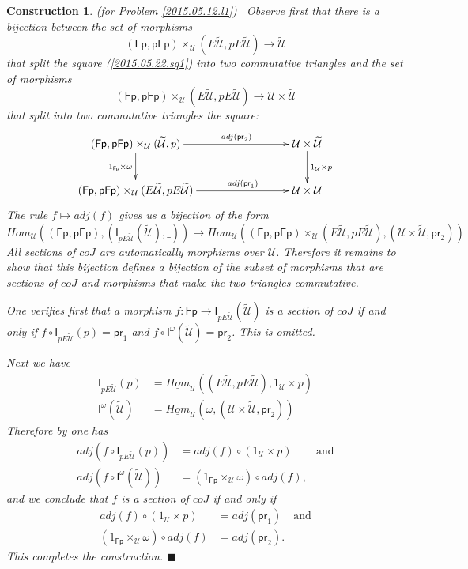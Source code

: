 \documentclass[12pt]{article}
\numberwithin{equation}{section}
\newtheorem{construction0}[proposition]{Construction}
\newenvironment{construction}[1]{\begin{construction0}(for Problem \ref{#1})\ }{$\blacksquare$ \end{construction0}}
\newcommand{\sr}{\rightarrow}
\newcommand{\uu}{\underline}
\newcommand{\iHom}{\uu{Hom}}
\newcommand{\wt}{\widetilde}
\newcommand{\id}{1}            %
\newcommand{\U}{\mathcal{U}}
\newcommand{\I}{\mathsf{I}}
\newcommand{\Fp}{\mathsf{Fp}}
\newcommand{\pFp}{\mathsf{pFp}}
\newcommand{\pr}{\mathsf{pr}}
\begin{document}
\begin{construction}{2015.05.12.l1}\rm
\label{2015.05.22.constr1} Observe first that there is a bijection between the
set of morphisms
%
$$(\Fp,\pFp)\times_\U(E\wt{\U},pE\wt{\U})\sr \wt{\U}$$
%
that split the square (\ref{2015.05.22.sq1}) into two commutative triangles and
the set of morphisms
%
$$(\Fp,\pFp)\times_\U(E\wt{\U},pE\wt{\U})\sr \U\times\wt{\U}$$
%
that split into two commutative triangles the square:
%
$$
\begin{xy}
          \xymatrix@C=7pc{ (\Fp,\pFp)\times_\U(\wt{\U},p) \ar[r]^-{adj(\pr_2)}
            \ar[d]_{\id_{\Fp}\times \omega} & \U\times \wt{\U} \ar[d]^{\id_\U\times
              p}\\ (\Fp,\pFp)\times_\U(E\wt{\U},pE\wt{\U}) \ar[r]^-{adj(\pr_1)} &
            \U\times \U }
\end{xy}
$$
%
The rule $f\mapsto adj(f)$ gives us a bijection of the form
%
$$Hom_\U((\Fp,\pFp),(\I_{pE\wt{\U}}(\wt{\U}),\_))\sr Hom_\U((\Fp,\pFp)\times_\U
(E\wt{\U},pE\wt{\U}), (\U\times\wt{\U}, \pr_2))$$
%
All sections of $coJ$ are automatically morphisms over $\U$. Therefore it
remains to show that this bijection defines a bijection of the subset of
morphisms that are sections of $coJ$ and morphisms that make the two triangles
commutative.

One verifies first that a morphism $f:\Fp\sr \I_{pE\wt{\U}}(\wt{\U})$ is a section
of $coJ$ if and only if $f\circ \I_{pE\wt{\U}}(p)=\pr_1$ and $f\circ
\I^{\omega}(\wt{\U})=\pr_2$. This is omitted.

Next we have
%
\begin{align*}
  \I_{pE\wt{\U}}(p)&=\iHom_\U((E\wt{\U},pE\wt{\U}),\id_\U\times p) \\
  \I^{\omega}(\wt{\U})&=\iHom_\U(\omega,(\U\times\wt{\U},\pr_2))
\end{align*}
%
Therefore by \cite[Lemma 4.1.7]{presheavesOb} one has
%
\begin{align*}
  adj(f\circ \I_{pE\wt{\U}}(p))&=adj(f)\circ (\id_\U\times p) & \text{and} \\
  adj(f\circ \I^{\omega}(\wt{\U}))&=(\id_{\Fp}\times_{\U}\omega)\circ adj(f),
\end{align*}
%
and we conclude that $f$ is a section of $coJ$ if and only if
%
\begin{align*}
  adj(f)\circ (\id_\U\times p)&=adj(\pr_1) & \text{and} \\
  (\id_{\Fp}\times_{\U}\omega)\circ adj(f)&=adj(\pr_2).
\end{align*}
% 
This completes the construction.
\end{construction}
\end{document}
